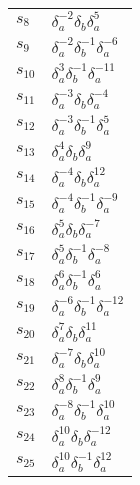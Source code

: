 \documentclass{article}
\begin{document}
\begin{center}
\begin{tabular}{ll}
$s_{8}$ & $\delta_a^{-2}\delta_b^{}\delta_a^{5}$ \\
$s_{9}$ & $\delta_a^{-2}\delta_b^{-1}\delta_a^{-6}$ \\
$s_{10}$ & $\delta_a^{3}\delta_b^{-1}\delta_a^{-11}$ \\
$s_{11}$ & $\delta_a^{-3}\delta_b^{}\delta_a^{-4}$ \\
$s_{12}$ & $\delta_a^{-3}\delta_b^{-1}\delta_a^{5}$ \\
$s_{13}$ & $\delta_a^{4}\delta_b^{}\delta_a^{9}$ \\
$s_{14}$ & $\delta_a^{-4}\delta_b^{}\delta_a^{12}$ \\
$s_{15}$ & $\delta_a^{-4}\delta_b^{-1}\delta_a^{-9}$ \\
$s_{16}$ & $\delta_a^{5}\delta_b^{}\delta_a^{-7}$ \\
$s_{17}$ & $\delta_a^{5}\delta_b^{-1}\delta_a^{-8}$ \\
$s_{18}$ & $\delta_a^{6}\delta_b^{-1}\delta_a^{6}$ \\
$s_{19}$ & $\delta_a^{-6}\delta_b^{-1}\delta_a^{-12}$ \\
$s_{20}$ & $\delta_a^{7}\delta_b^{}\delta_a^{11}$ \\
$s_{21}$ & $\delta_a^{-7}\delta_b^{}\delta_a^{10}$ \\
$s_{22}$ & $\delta_a^{8}\delta_b^{-1}\delta_a^{9}$ \\
$s_{23}$ & $\delta_a^{-8}\delta_b^{-1}\delta_a^{10}$ \\
$s_{24}$ & $\delta_a^{10}\delta_b^{}\delta_a^{-12}$ \\
$s_{25}$ & $\delta_a^{10}\delta_b^{-1}\delta_a^{12}$ \\
\bottomrule
\end{tabular}
\end{center}

\thispagestyle{empty}
\end{document}
